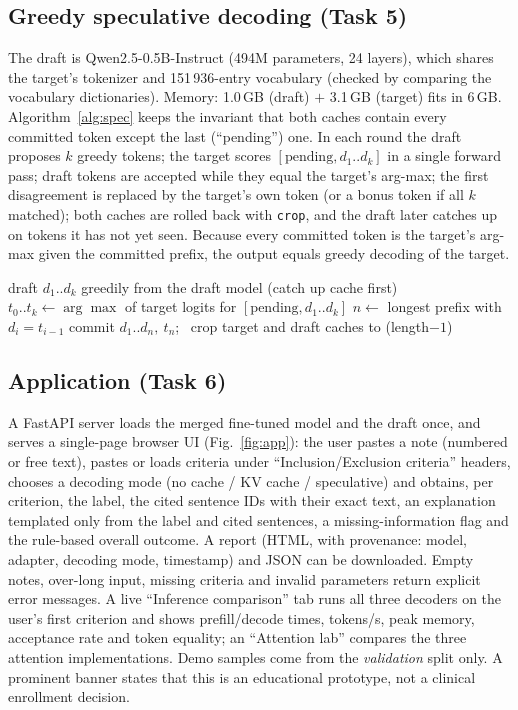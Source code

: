 \documentclass[conference]{IEEEtran}
\begin{document}
\subsection{Greedy speculative decoding (Task 5)}
The draft is Qwen2.5-0.5B-Instruct (494M parameters, 24 layers), which shares the target's tokenizer and 151\,936-entry vocabulary (checked by comparing the vocabulary dictionaries). Memory: 1.0\,GB (draft) $+$ 3.1\,GB (target) fits in 6\,GB. Algorithm~\ref{alg:spec} keeps the invariant that both caches contain every committed token except the last (``pending'') one. In each round the draft proposes $k$ greedy tokens; the target scores $[\text{pending},d_1..d_k]$ in a single forward pass; draft tokens are accepted while they equal the target's arg-max; the first disagreement is replaced by the target's own token (or a bonus token if all $k$ matched); both caches are rolled back with \texttt{crop}, and the draft later catches up on tokens it has not yet seen. Because every committed token is the target's arg-max given the committed prefix, the output equals greedy decoding of the target.

\begin{algorithm}[t]
\caption{Greedy speculative decoding round}\label{alg:spec}
\begin{algorithmic}[1]
\State draft $d_1..d_k$ greedily from the draft model (catch up cache first)
\State $t_0..t_k\gets\arg\max$ of target logits for $[\text{pending},d_1..d_k]$
\State $n\gets$ longest prefix with $d_i=t_{i-1}$
\State commit $d_1..d_n,\ t_n$; \ crop target and draft caches to (length$-1$)
\end{algorithmic}
\end{algorithm}

\subsection{Application (Task 6)}
A FastAPI server loads the merged fine-tuned model and the draft once, and serves a single-page browser UI (Fig.~\ref{fig:app}): the user pastes a note (numbered or free text), pastes or loads criteria under ``Inclusion/Exclusion criteria'' headers, chooses a decoding mode (no cache / KV cache / speculative) and obtains, per criterion, the label, the cited sentence IDs with their exact text, an explanation templated only from the label and cited sentences, a missing-information flag and the rule-based overall outcome. A report (HTML, with provenance: model, adapter, decoding mode, timestamp) and JSON can be downloaded. Empty notes, over-long input, missing criteria and invalid parameters return explicit error messages. A live ``Inference comparison'' tab runs all three decoders on the user's first criterion and shows prefill/decode times, tokens/s, peak memory, acceptance rate and token equality; an ``Attention lab'' compares the three attention implementations. Demo samples come from the \emph{validation} split only. A prominent banner states that this is an educational prototype, not a clinical enrollment decision.
\end{document}
